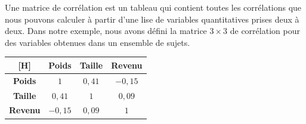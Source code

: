 Une matrice de corrélation est un tableau qui contient toutes les corrélations que nous pouvons calculer à partir d'une lise de variables quantitatives prises deux à deux. Dans notre exemple, nous avons défini la matrice $3\times 3$ de corrélation pour des variables obtenues dans un ensemble de sujets.


\begin{center}
\begin{tabular}{c|ccc}[H]
& \multicolumn{1}{c}{\textbf{Poids}} & \multicolumn{1}{c}{\textbf{Taille}} & \multicolumn{1}{c}{\textbf{Revenu}} \\ \hline
\multicolumn{1}{c|}{\textbf{Poids}}  & $1$ & $0,41$ & $-0,15$ \\ 
\multicolumn{1}{c|}{\textbf{Taille}} & $0,41$ & $1$ & $0,09$ \\ 
\multicolumn{1}{c|}{\textbf{Revenu}} & $-0,15$ & $0,09$ & $1$ \\ 
\end{tabular}
\end{center}


